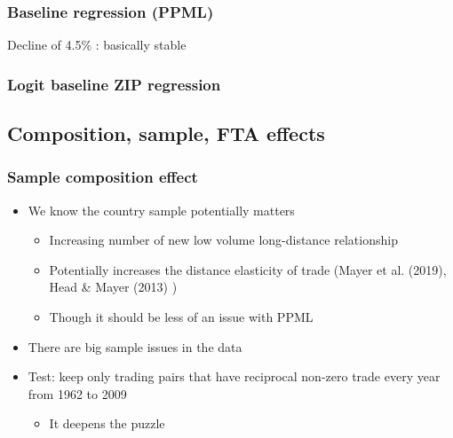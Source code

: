 \documentclass{beamer}
\begin{document}
\begin{frame}[plain]\frametitle{Baseline regression (PPML)}
\begin{figure}[h!]
\begin{center}
\setlength{\fboxrule}{1pt} %
\setlength{\fboxsep}{.1in} %
\end{center}
\end{figure}
Decline of 4.5\% : basically stable
\end{frame}

\begin{frame}[plain]\frametitle{Logit baseline ZIP regression}
\begin{figure}[h!]
\begin{center}
\setlength{\fboxrule}{1pt} %
\setlength{\fboxsep}{.1in} %
\end{center}
\end{figure}

\end{frame}
\fi

\subsection{Composition, sample, FTA effects}
\begin{frame}\frametitle{Sample composition effect}
\begin{itemize}
\item We know the country sample potentially matters
	\begin{itemize}
	\item Increasing number of new low volume long-distance relationship
	\item Potentially increases the distance elasticity of trade (Mayer et al. (2019), Head \& Mayer (2013) ) 
	\item Though it should be less of an issue with PPML
	\end{itemize}
\item There are big sample issues in the data	
\item Test: keep only trading pairs that have reciprocal non-zero trade every year from 1962 to 2009
	\begin{itemize}
	\item It deepens the puzzle 
	\end{itemize}
\end{itemize}
\end{frame}
\end{document}
